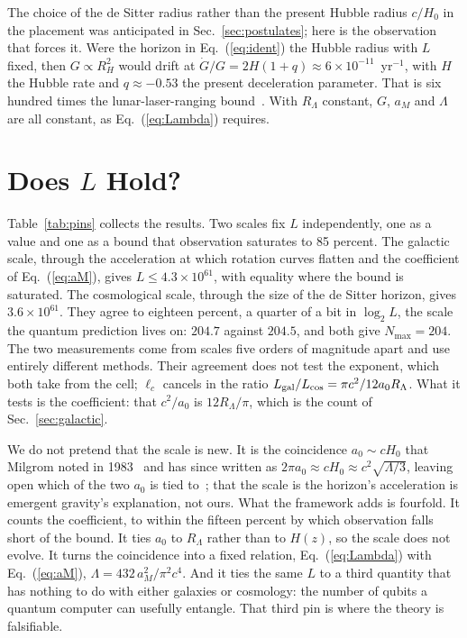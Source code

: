 \documentclass[aps,prd,twocolumn,superscriptaddress,nofootinbib,showkeys]{revtex4-2}
\newcommand{\lc}{\ell_c}
\newcommand{\RL}{R_\Lambda}
\begin{document}
The choice of the de Sitter radius rather than the present Hubble radius $c/H_0$ in the placement was anticipated in Sec.~\ref{sec:postulates}; here is the observation that forces it. Were the horizon in Eq.~(\ref{eq:ident}) the Hubble radius with $L$ fixed, then $G\propto R_H^2$ would drift at $\dot G/G = 2H(1+q)\approx6\times10^{-11}$~yr$^{-1}$, with $H$ the Hubble rate and $q\approx-0.53$ the present deceleration parameter. That is six hundred times the lunar-laser-ranging bound~\cite{hofmann2018}. With $\RL$ constant, $G$, $a_M$ and $\Lambda$ are all constant, as Eq.~(\ref{eq:Lambda}) requires.

\section{Does $L$ Hold?}
\label{sec:hold}

Table~\ref{tab:pins} collects the results. Two scales fix $L$ independently, one as a value and one as a bound that observation saturates to 85 percent. The galactic scale, through the acceleration at which rotation curves flatten and the coefficient of Eq.~(\ref{eq:aM}), gives $L \le 4.3\times10^{61}$, with equality where the bound is saturated. The cosmological scale, through the size of the de Sitter horizon, gives $3.6\times10^{61}$. They agree to eighteen percent, a quarter of a bit in $\log_2 L$, the scale the quantum prediction lives on: $204.7$ against $204.5$, and both give $N_{\max} = 204$. The two measurements come from scales five orders of magnitude apart and use entirely different methods. Their agreement does not test the exponent, which both take from the cell; $\lc$ cancels in the ratio $L_{\rm gal}/L_{\rm cos} = \pi c^2/12 a_0\RL$. What it tests is the coefficient: that $c^2/a_0$ is $12\RL/\pi$, which is the count of Sec.~\ref{sec:galactic}.

We do not pretend that the scale is new. It is the coincidence $a_0\sim cH_0$ that Milgrom noted in 1983~\cite{milgrom1983} and has since written as $2\pi a_0\approx cH_0\approx c^2\sqrt{\Lambda/3}$, leaving open which of the two $a_0$ is tied to~\cite{milgrom2020}; that the scale is the horizon's acceleration is emergent gravity's explanation, not ours. What the framework adds is fourfold. It counts the coefficient, to within the fifteen percent by which observation falls short of the bound. It ties $a_0$ to $\RL$ rather than to $H(z)$, so the scale does not evolve. It turns the coincidence into a fixed relation, Eq.~(\ref{eq:Lambda}) with Eq.~(\ref{eq:aM}), $\Lambda = 432\,a_M^2/\pi^2c^4$. And it ties the same $L$ to a third quantity that has nothing to do with either galaxies or cosmology: the number of qubits a quantum computer can usefully entangle. That third pin is where the theory is falsifiable.
\end{document}
